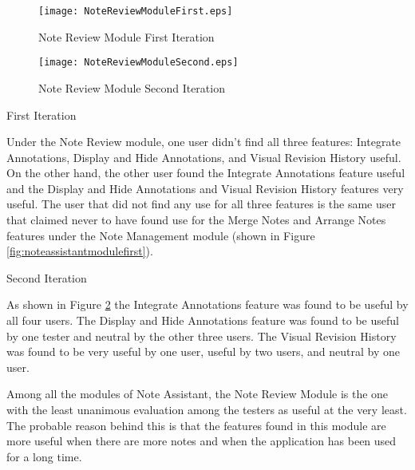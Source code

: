 \begin{figure}[htbp!]
   \centering
   \texttt{[image: NoteReviewModuleFirst.eps]} 
   \caption{Note Review Module First Iteration}
   \label{fig:notereviewmodulefirst}
\end{figure}

\begin{figure}[htbp!]
   \centering
   \texttt{[image: NoteReviewModuleSecond.eps]} 
   \caption{Note Review Module Second Iteration}
   \label{fig:notereviewmodulesecond}
\end{figure}

\pagebreak

\begin{flushleft}
First Iteration
\end{flushleft}

\begin{raggedright}
Under the Note Review module, one user didn't find all three features: Integrate Annotations, Display and Hide Annotations, and Visual Revision History useful. On the other hand, the other user found the Integrate Annotations feature useful and the Display and Hide Annotations and Visual Revision History features very useful. The user that did not find any use for all three features is the same user that claimed never to have found use for the Merge Notes and Arrange Notes features under the Note Management module (shown in Figure \ref{fig:noteassistantmodulefirst}). 
\end{raggedright}

\begin{flushleft}
Second Iteration
\end{flushleft}

\begin{raggedright}
As shown in Figure \ref{fig:notereviewmodulesecond} the Integrate Annotations feature was found to be useful by all four users. The Display and Hide Annotations feature was found to be useful by one tester and neutral by the other three users. The Visual Revision History was found to be very useful by one user, useful by two users, and neutral by one user. 
\end{raggedright}

Among all the modules of Note Assistant, the Note Review Module is the one with the least unanimous evaluation among the testers as useful at the very least. The probable reason behind this is that the features found in this module are more useful when there are more notes and when the application has been used for a long time.

